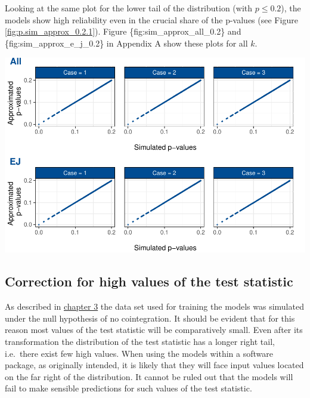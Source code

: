\documentclass[12pt,a4paper]{article}
\let\origfigure\figure
\let\endorigfigure\endfigure
\renewenvironment{figure}[1][2] {
    \expandafter\origfigure\expandafter[H]
} {
    \endorigfigure
}
\begin{document}
Looking at the same plot for the lower tail of the distribution (with
\(p \leq 0.2\)), the models show high reliability even in the crucial
share of the p-values (see Figure \ref{fig:p.sim_approx_0.2.1}). Figure
\{fig:sim\_approx\_all\_0.2\} and \{fig:sim\_approx\_e\_j\_0.2\} in
Appendix A show these plots for all \(k\).

\begin{figure}
\centering
\includegraphics{p_approx_paper_files/figure-latex/p.sim_aprox_0.2.k1-1.pdf}
\caption{\label{fig:p.sim_approx_0.2.1} Simulated p-values plotted
against p-values approximated by final (corrected) models, exemplary for
\(k = 1\), for the lower tail of the distribution.}
\end{figure}

\hypertarget{correction-for-high-values-of-the-test-statistic}{%
\subsection{Correction for high values of the test
statistic}\label{correction-for-high-values-of-the-test-statistic}}

As described in \protect\hyperlink{simulation}{chapter 3} the data set
used for training the models was simulated under the null hypothesis of
no cointegration. It should be evident that for this reason most values
of the test statistic will be comparatively small. Even after its
transformation the distribution of the test statistic has a longer right
tail, i.e.~there exist few high values. When using the models within a
software package, as originally intended, it is likely that they will
face input values located on the far right of the distribution. It
cannot be ruled out that the models will fail to make sensible
predictions for such values of the test statistic.
\end{document}
